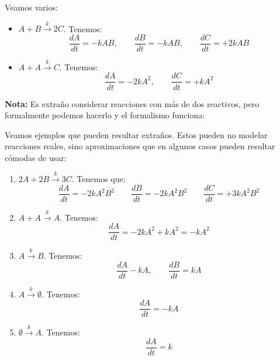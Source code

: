 \begin{ejemplo}
    Veamos varios:
    \begin{itemize}
        \item $A+B\stackrel{k}{\longrightarrow} 2C$.
            Tenemos:
            \begin{equation*}
                \frac{dA}{dt} = -kAB, \qquad \frac{dB}{dt} = -kAB, \qquad \frac{dC}{dt} = +2kAB
            \end{equation*}
        \item $A+A\stackrel{k}{\longrightarrow} C$.
            Tenemos:
            \begin{equation*}
                \frac{dA}{dt} = -2kA^2, \qquad \frac{dC}{dt} = +kA^2
            \end{equation*}
    \end{itemize}
\end{ejemplo}

\noindent
\textbf{Nota:} Es extraño considerar reacciones con más de dos reactivos, pero formalmente podemos hacerlo y el formalismo funciona:
\begin{ejemplo}
    Veamos ejemplos que pueden resultar extraños. Estos pueden no modelar reacciones reales, sino aproximaciones que en algunos casos pueden resultar cómodas de usar:
    \begin{enumerate}
        \item $2A + 2B \stackrel{k}{\longrightarrow} 3C$. Tenemos que:
            \begin{equation*}
                \frac{dA}{dt} = -2kA^2B^2 \qquad 
                \frac{dB}{dt} = -2kA^2B^2 \qquad 
                \frac{dC}{dt} = +3kA^2B^2
            \end{equation*}
        \item $A+A\stackrel{k}{\longrightarrow} A$. Tenemos:
            \begin{equation*}
                \frac{dA}{dt} = -2kA^2 + kA^2 = -kA^2
            \end{equation*}
        \item $A\stackrel{k}{\longrightarrow} B$. Tenemos:
            \begin{equation*}
                \frac{dA}{dt} -kA, \qquad \frac{dB}{dt} = kA
            \end{equation*}
        \item $A\stackrel{k}{\longrightarrow}\emptyset $. Tenemos:
            \begin{equation*}
                \frac{dA}{dt} = -kA
            \end{equation*}
        \item $\emptyset \stackrel{k}{\longrightarrow} A$. Tenemos:
            \begin{equation*}
                \frac{dA}{dt} = k
            \end{equation*}
    \end{enumerate}
\end{ejemplo}~\\

